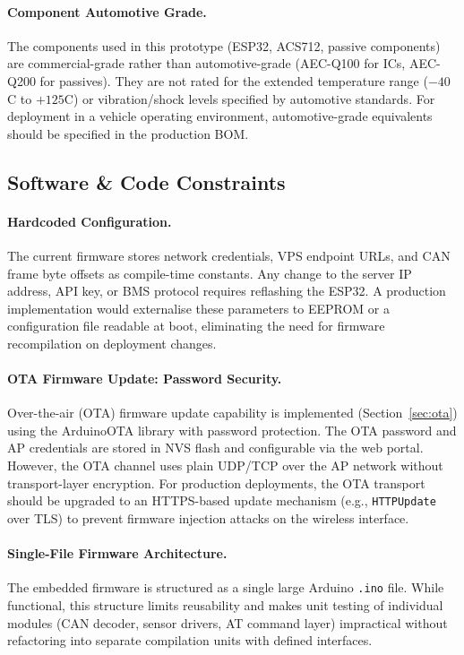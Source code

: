 \paragraph{Component Automotive Grade.}
The components used in this prototype (ESP32, ACS712, passive components) are commercial-grade rather than automotive-grade (AEC-Q100 for ICs, AEC-Q200 for passives). They are not rated for the extended temperature range ($-40$\textdegree{}C to $+125$\textdegree{}C) or vibration/shock levels specified by automotive standards. For deployment in a vehicle operating environment, automotive-grade equivalents should be specified in the production BOM.

\subsection{Software \& Code Constraints}

\paragraph{Hardcoded Configuration.}
The current firmware stores network credentials, VPS endpoint URLs, and CAN frame byte offsets as compile-time constants. Any change to the server IP address, API key, or BMS protocol requires reflashing the ESP32. A production implementation would externalise these parameters to EEPROM or a configuration file readable at boot, eliminating the need for firmware recompilation on deployment changes.

\paragraph{OTA Firmware Update: Password Security.}
Over-the-air (OTA) firmware update capability is implemented (Section~\ref{sec:ota}) using the ArduinoOTA library with password protection. The OTA password and AP credentials are stored in NVS flash and configurable via the web portal. However, the OTA channel uses plain UDP/TCP over the AP network without transport-layer encryption. For production deployments, the OTA transport should be upgraded to an HTTPS-based update mechanism (e.g., \texttt{HTTPUpdate} over TLS) to prevent firmware injection attacks on the wireless interface.

\paragraph{Single-File Firmware Architecture.}
The embedded firmware is structured as a single large Arduino \texttt{.ino} file. While functional, this structure limits reusability and makes unit testing of individual modules (CAN decoder, sensor drivers, AT command layer) impractical without refactoring into separate compilation units with defined interfaces.

